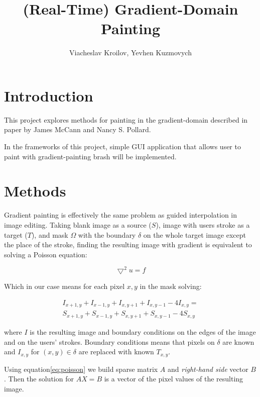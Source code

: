 \documentclass[hidelinks, english]{report}
\title{(Real-Time) Gradient-Domain Painting}
\author{Viacheslav Kroilov, Yevhen Kuzmovych}
\affiliation{ČVUT - FIT}
\begin{document}
\maketitle

\section{Introduction}

This project explores methods for painting in the gradient-domain described in paper by James McCann and
Nancy S. Pollard\cite{gradient}.

In the frameworks of this project, simple GUI application that allows user to paint with gradient-painting brash will
be implemented.


\section{Methods}
Gradient painting is effectively the same problem as guided interpolation in image editing. Taking blank image as a
source ($S$), image with users stroke as a target ($T$), and mask $\Omega$ with the boundary $\delta$ on the whole
target image except the place of the stroke, finding the resulting image with gradient is equivalent to solving
a Poisson equation:

\begin{equation}
    \bigtriangledown^2 u = f
\end{equation}

Which in our case means for each pixel $x,y$ in the mask solving:

\begin{equation}
    \begin{multlined}
        I_{x+1,y} + I_{x-1,y} + I_{x,y+1} + I_{x,y-1} - 4I_{x,y} = \\
        S_{x+1,y} + S_{x-1,y} + S_{x,y+1} + S_{x,y-1} - 4S_{x,y}
    \end{multlined}
    \label{eq:poisson}
\end{equation}

where $I$ is the resulting image and boundary conditions on the edges of the image and on the users' strokes. Boundary
conditions means that pixels on $\delta$ are known and $I_{x,y}$ for $ (x,y) \in \delta$ are replaced with
known $T_{x,y}$.

Using equation\eqref{eq:poisson} we build sparse matrix $A$ and \textit{right-hand side} vector $B$. Then the solution
for $AX=B$ is a vector of the pixel values of the resulting image.
\end{document}

